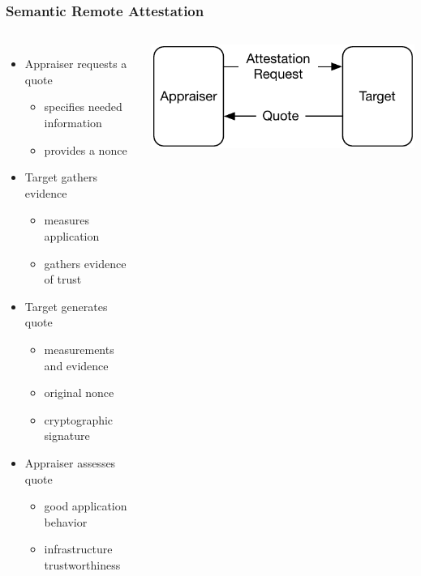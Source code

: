 \documentclass{beamer}
\begin{document}
\begin{frame}
  \frametitle{Semantic Remote Attestation}

  \begin{columns}[c]
    \begin{itemize}
    \item Appraiser requests a quote
      \begin{itemize}
      \item specifies needed information
      \item provides a nonce
      \end{itemize}
    \item Target gathers evidence
      \begin{itemize}
      \item measures application
      \item gathers evidence of trust
      \end{itemize}
    \item Target generates quote
      \begin{itemize}
      \item measurements and evidence
      \item original nonce
      \item cryptographic signature
      \end{itemize}
    \item Appraiser assesses quote
      \begin{itemize}
      \item good application behavior
      \item infrastructure trustworthiness
      \end{itemize}
    \end{itemize}
    \begin{center}
      \includegraphics[width=.95\textwidth]{figures/remote-att.pdf}
    \end{center}
  \end{columns}
\end{frame}
\end{document}
